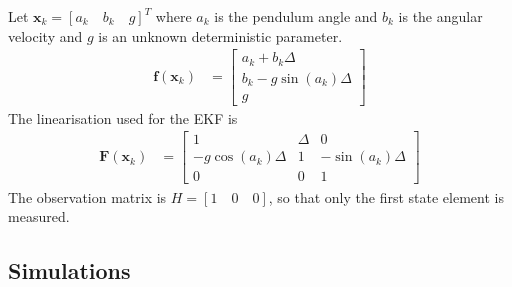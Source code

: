\documentclass{article}
\renewcommand{\vec}[1]{\ensuremath{{\boldsymbol #1}}}
\newcommand{\mat}[1]{\ensuremath{\boldsymbol{#1}}}
\begin{document}
Let $\vec x_k = [a_k\quad b_k\quad g]^T$ where $a_k$ is the pendulum angle and $b_k$ is the angular velocity and $g$ is an unknown deterministic parameter.
\begin{align}
	\vec f(\vec x_{k}) &= \left[\begin{array}{c}
								a_k + b_k\Delta \\ b_k - g\sin(a_k)\Delta \\ g
								\end{array}\right]
\end{align}
The linearisation used for the EKF is
\begin{align}
	\mat F(\vec x_{k}) &= \left[\begin{array}{ccc}
					1 & \Delta & 0\\
					-g\cos(a_k)\Delta & 1 & -\sin(a_k)\Delta\\
					0 & 0 & 1
				\end{array}\right]
\end{align}
The observation matrix is $H=[1\quad 0\quad 0]$, so that only the first state element is measured.

\subsection{Simulations}
\end{document}
